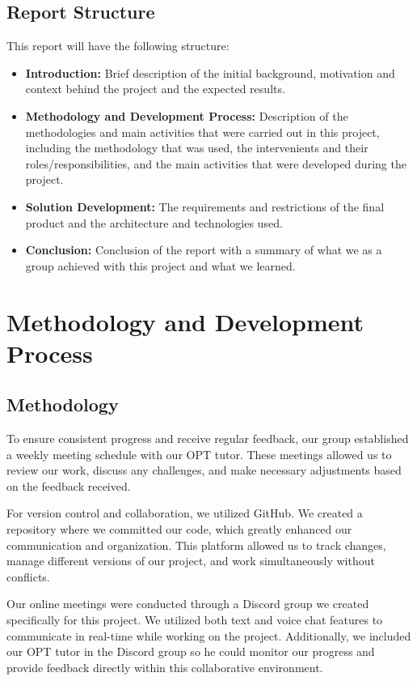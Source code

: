 \documentclass[10pt]{article}
\begin{document}
    \subsection{Report Structure}
        This report will have the following structure:
        \begin{itemize}
            \item     \textbf{Introduction:} Brief description of the initial background, motivation and context behind the project and the expected results.
            \item     \textbf{Methodology and Development Process:} Description of the methodologies and main activities that were carried out in this project, including the methodology that was used, the intervenients and their roles/responsibilities, and the main activities that were developed during the project.
            \item     \textbf{Solution Development:} The requirements and restrictions of the final product and the architecture and technologies used.
            \item     \textbf{Conclusion:} Conclusion of the report with a summary of what we as a group achieved with this project and what we learned.
        \end{itemize}

\section{Methodology and Development Process}

    \subsection{Methodology}
        
        To ensure consistent progress and receive regular feedback, our group established a weekly meeting schedule with our OPT tutor. These meetings allowed us to review our work, discuss any challenges, and make necessary adjustments based on the feedback received.
        
        For version control and collaboration, we utilized GitHub. We created a repository where we committed our code, which greatly enhanced our communication and organization. This platform allowed us to track changes, manage different versions of our project, and work simultaneously without conflicts.
        
        Our online meetings were conducted through a Discord group we created specifically for this project. We utilized both text and voice chat features to communicate in real-time while working on the project. Additionally, we included our OPT tutor in the Discord group so he could monitor our progress and provide feedback directly within this collaborative environment.
        
\end{document}
